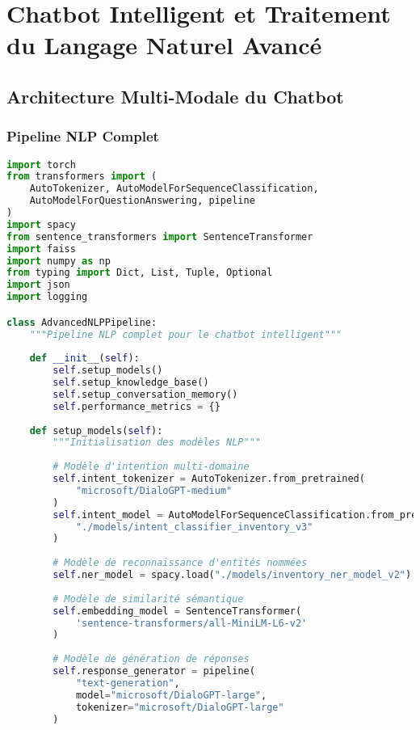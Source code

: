 \documentclass[12pt,a4paper]{report}
\begin{document}
\section{Chatbot Intelligent et Traitement du Langage Naturel Avancé}

\subsection{Architecture Multi-Modale du Chatbot}

\subsubsection{Pipeline NLP Complet}

\begin{lstlisting}[language=Python, caption=Pipeline NLP avancé pour le chatbot]
import torch
from transformers import (
    AutoTokenizer, AutoModelForSequenceClassification,
    AutoModelForQuestionAnswering, pipeline
)
import spacy
from sentence_transformers import SentenceTransformer
import faiss
import numpy as np
from typing import Dict, List, Tuple, Optional
import json
import logging

class AdvancedNLPPipeline:
    """Pipeline NLP complet pour le chatbot intelligent"""
    
    def __init__(self):
        self.setup_models()
        self.setup_knowledge_base()
        self.setup_conversation_memory()
        self.performance_metrics = {}
    
    def setup_models(self):
        """Initialisation des modèles NLP"""
        
        # Modèle d'intention multi-domaine
        self.intent_tokenizer = AutoTokenizer.from_pretrained(
            "microsoft/DialoGPT-medium"
        )
        self.intent_model = AutoModelForSequenceClassification.from_pretrained(
            "./models/intent_classifier_inventory_v3"
        )
        
        # Modèle de reconnaissance d'entités nommées
        self.ner_model = spacy.load("./models/inventory_ner_model_v2")
        
        # Modèle de similarité sémantique
        self.embedding_model = SentenceTransformer(
            'sentence-transformers/all-MiniLM-L6-v2'
        )
        
        # Modèle de génération de réponses
        self.response_generator = pipeline(
            "text-generation",
            model="microsoft/DialoGPT-large",
            tokenizer="microsoft/DialoGPT-large"
        )
        

\end{lstlisting}
\end{document}
